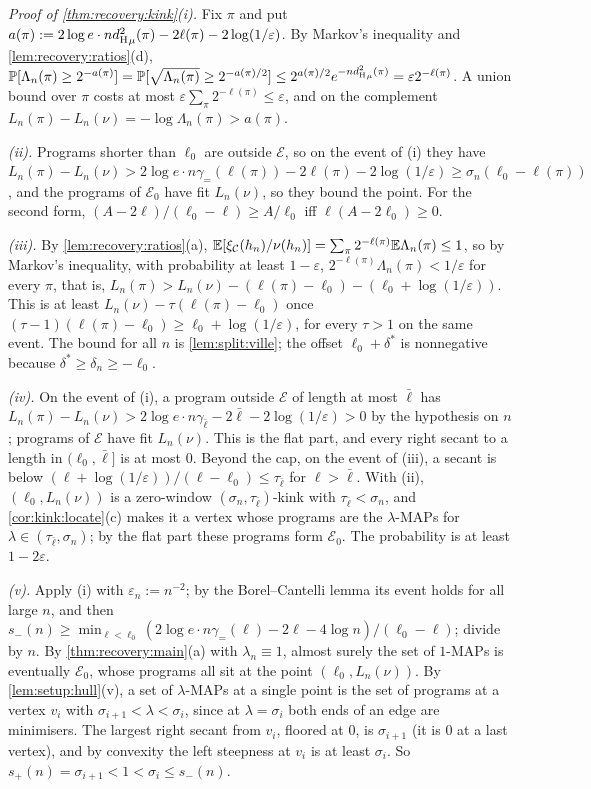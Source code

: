\emph{Proof of \cref{thm:recovery:kink}(i).} Fix $\pi$ and put $a(\pi):=2\log e\cdot n{d_{\mathrm{H}}^{2}}_\mu(\pi)-2\ell(\pi)-2\log(1/\varepsilon)$. By Markov's inequality and \cref{lem:recovery:ratios}(d), $\mathbb{P}[\Lambda_n(\pi)\ge2^{-a(\pi)}]=\mathbb{P}[\sqrt{\Lambda_n(\pi)}\ge2^{-a(\pi)/2}]\le2^{a(\pi)/2}e^{-n{d_{\mathrm{H}}^{2}}_\mu(\pi)}=\varepsilon2^{-\ell(\pi)}$. A union bound over $\pi$ costs at most $\varepsilon\sum_\pi2^{-\ell(\pi)}\le\varepsilon$, and on the complement $L_n(\pi)-L_n(\nu)=-\log\Lambda_n(\pi)>a(\pi)$.

\emph{(ii).} Programs shorter than $\ell_0$ are outside $\mathcal E$, so on the event of (i) they have $L_n(\pi)-L_n(\nu)>2\log e\cdot n\gamma_=(\ell(\pi))-2\ell(\pi)-2\log(1/\varepsilon)\ge\sigma_n(\ell_0-\ell(\pi))$, and the programs of $\mathcal E_0$ have fit $L_n(\nu)$, so they bound the point. For the second form, $(A-2\ell)/(\ell_0-\ell)\ge A/\ell_0$ iff $\ell(A-2\ell_0)\ge0$.

\emph{(iii).} By \cref{lem:recovery:ratios}(a), $\mathbb{E}[\xi_{\mathcal C}(h_n)/\nu(h_n)]=\sum_\pi2^{-\ell(\pi)}\mathbb{E}\Lambda_n(\pi)\le1$, so by Markov's inequality, with probability at least $1-\varepsilon$, $2^{-\ell(\pi)}\Lambda_n(\pi)<1/\varepsilon$ for every $\pi$, that is, $L_n(\pi)>L_n(\nu)-(\ell(\pi)-\ell_0)-(\ell_0+\log(1/\varepsilon))$. This is at least $L_n(\nu)-\tau(\ell(\pi)-\ell_0)$ once $(\tau-1)(\ell(\pi)-\ell_0)\ge\ell_0+\log(1/\varepsilon)$, for every $\tau>1$ on the same event. The bound for all $n$ is \cref{lem:split:ville}; the offset $\ell_0+\delta^*$ is nonnegative because $\delta^*\ge\delta_n\ge-\ell_0$.

\emph{(iv).} On the event of (i), a program outside $\mathcal E$ of length at most $\bar\ell$ has $L_n(\pi)-L_n(\nu)>2\log e\cdot n\gamma_{\bar\ell}-2\bar\ell-2\log(1/\varepsilon)>0$ by the hypothesis on $n$; programs of $\mathcal E$ have fit $L_n(\nu)$. This is the flat part, and every right secant to a length in $(\ell_0,\bar\ell]$ is at most $0$. Beyond the cap, on the event of (iii), a secant is below $(\ell+\log(1/\varepsilon))/(\ell-\ell_0)\le\tau_{\bar\ell}$ for $\ell>\bar\ell$. With (ii), $(\ell_0,L_n(\nu))$ is a zero-window $(\sigma_n,\tau_{\bar\ell})$-kink with $\tau_{\bar\ell}<\sigma_n$, and \cref{cor:kink:locate}(c) makes it a vertex whose programs are the $\lambda$-MAPs for $\lambda\in(\tau_{\bar\ell},\sigma_n)$; by the flat part these programs form $\mathcal E_0$. The probability is at least $1-2\varepsilon$.

\emph{(v).} Apply (i) with $\varepsilon_n:=n^{-2}$; by the Borel--Cantelli lemma its event holds for all large $n$, and then $s_-(n)\ge\min_{\ell<\ell_0}(2\log e\cdot n\gamma_=(\ell)-2\ell-4\log n)/(\ell_0-\ell)$; divide by $n$. By \cref{thm:recovery:main}(a) with $\lambda_n\equiv1$, almost surely the set of $1$-MAPs is eventually $\mathcal E_0$, whose programs all sit at the point $(\ell_0,L_n(\nu))$. By \cref{lem:setup:hull}(v), a set of $\lambda$-MAPs at a single point is the set of programs at a vertex $v_i$ with $\sigma_{i+1}<\lambda<\sigma_i$, since at $\lambda=\sigma_i$ both ends of an edge are minimisers. The largest right secant from $v_i$, floored at $0$, is $\sigma_{i+1}$ (it is $0$ at a last vertex), and by convexity the left steepness at $v_i$ is at least $\sigma_i$. So $s_+(n)=\sigma_{i+1}<1<\sigma_i\le s_-(n)$.

